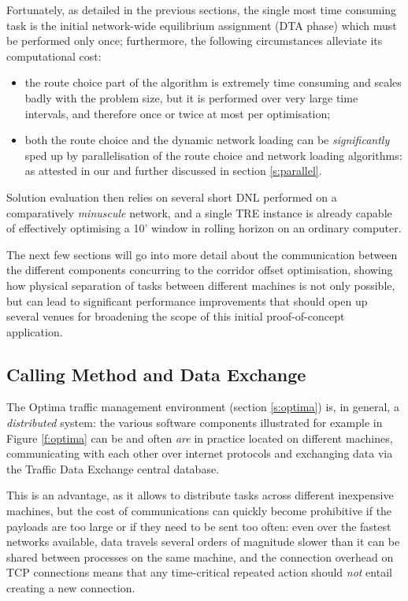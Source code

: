 Fortunately, as detailed in the previous sections, the single most time consuming task is the initial network-wide equilibrium assignment (DTA phase) which must be performed only once; furthermore, the following circumstances alleviate its computational cost:
\begin{itemize}
\item the route choice part of the algorithm is extremely time consuming and scales badly with the problem size, but it is performed over very large time intervals, and therefore once or twice at most per optimisation;
\item both the route choice and the dynamic network loading can be \emph{significantly} sped up by parallelisation of the route choice and network loading algorithms: as attested in our \citep{attanasi2015real} and further discussed in section \ref{s:parallel}.
\end{itemize} 

Solution evaluation then relies on several short DNL performed on a comparatively \emph{minuscule} network, and a single TRE instance is already capable of effectively optimising a 10' window in rolling horizon on an ordinary computer.

The next few sections will go into more detail about the communication between the different components concurring to the corridor offset optimisation, showing how physical separation of tasks between different machines is not only possible, but can lead to significant performance improvements that should open up several venues for broadening the scope of this initial proof-of-concept application.

\subsection{Calling Method and Data Exchange}
The Optima traffic management environment (section \ref{s:optima}) is, in general, a \emph{distributed} system: the various software components illustrated for example in Figure \ref{f:optima} can be and often \emph{are} in practice located on different machines, communicating with each other over internet protocols and exchanging data via the Traffic Data Exchange central database.

This is an advantage, as it allows to distribute tasks across different inexpensive machines, but the cost of communications can quickly become prohibitive if the payloads are too large or if they need to be sent too often: even over the fastest networks available, data travels several orders of magnitude slower than it can be shared between processes on the same machine, and the connection overhead on TCP connections means that any time-critical repeated action should \emph{not} entail creating a new connection.

